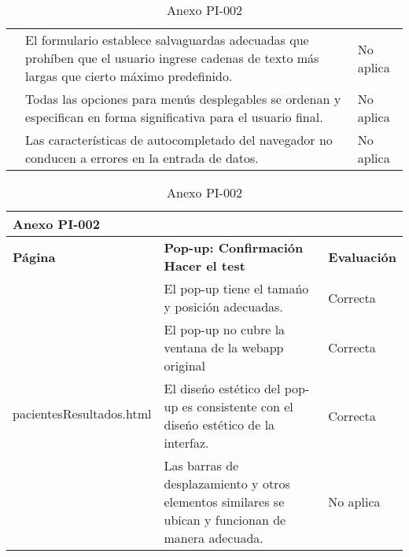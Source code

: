 \begin{table}[htpb]
\begin{tabularx}{\textwidth}{|l|X|l|}
                                           & El formulario establece salvaguardas adecuadas que prohíben que el usuario ingrese cadenas de texto más largas que cierto máximo predefinido.             & No aplica           \\ \cline{2-3} 
                                           & Todas las opciones para menús desplegables se ordenan y especifican en forma significativa para el usuario final.                                         & No aplica           \\ \cline{2-3} 
                                           & Las características de autocompletado del navegador no conducen a errores en la entrada de datos.                                                         & No aplica           \\ \hline
\end{tabularx}
\caption{Anexo PI-002}
\end{table}


\begin{table}[htpb]
\centering
\begin{tabularx}{\textwidth}{|l|X|l|}
\hline
\multicolumn{3}{|l|}{\textbf{Anexo PI-002}}                                                                                                                           \\ \hline
\textbf{Página}                           & \textbf{Pop-up: Confirmación Hacer el test}                                                        & \textbf{Evaluación} \\ \hline
\multirow{4}{*}{pacientesResultados.html} & El pop-up tiene el tamańo y posición adecuadas.                                                    & Correcta            \\ \cline{2-3} 
                                          & El pop-up no cubre la ventana de la webapp original                                                & Correcta            \\ \cline{2-3} 
                                          & El diseńo estético del pop-up es consistente con el diseńo estético de la interfaz.                & Correcta            \\ \cline{2-3} 
                                          & Las barras de desplazamiento y otros elementos similares se ubican y funcionan de manera adecuada. & No aplica           \\ \hline
\end{tabularx}
\caption{Anexo PI-002}
\end{table}


